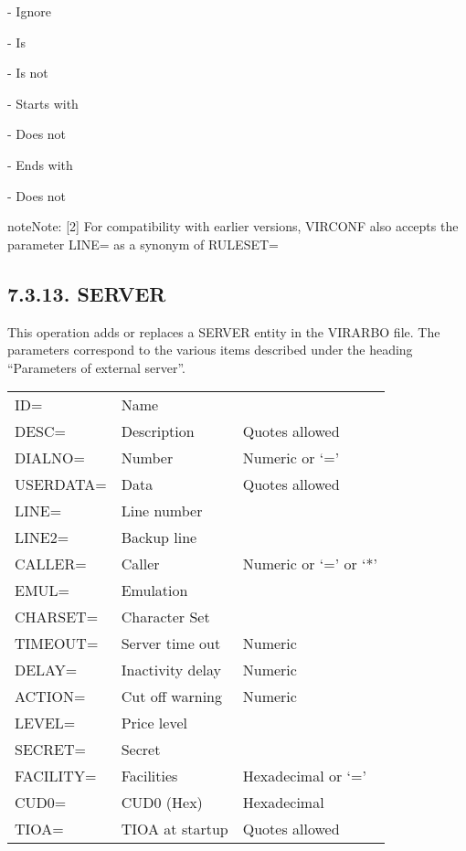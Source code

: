 \documentclass[letterpaper,10pt,english]{sphinxmanual}
\begin{document}
   - Ignore

    - Is

    - Is not

    - Starts with

 - Does not

      - Ends with

   - Does not

\begin{sphinxadmonition}{note}{Note:}
{[}2{]} For compatibility with earlier versions, VIRCONF also accepts the parameter LINE= as a synonym of RULESET=
\end{sphinxadmonition}


\subsection{7.3.13. SERVER}
\label{\detokenize{Installation_Guide:server}}
This operation adds or replaces a SERVER entity in the VIRARBO file. The parameters correspond to the various items described under the heading “Parameters of external server”.


\begin{savenotes}\sphinxattablestart
\centering
\begin{tabulary}{\linewidth}[t]{|T|T|T|}
\hline
{}\relax &\relax &\relax \\
\hline
ID=
&
Name
&\\
\hline
DESC=
&
Description
&
Quotes allowed
\\
\hline
DIALNO=
&
Number
&
Numeric or ‘=’
\\
\hline
USERDATA=
&
Data
&
Quotes allowed
\\
\hline
LINE=
&
Line number
&\\
\hline
LINE2=
&
Backup line
&\\
\hline
CALLER=
&
Caller
&
Numeric or ‘=’ or ‘*’
\\
\hline
EMUL=
&
Emulation
&\\
\hline
CHARSET=
&
Character Set
&\\
\hline
TIMEOUT=
&
Server time out
&
Numeric
\\
\hline
DELAY=
&
Inactivity delay
&
Numeric
\\
\hline
ACTION=
&
Cut off warning
&
Numeric
\\
\hline
LEVEL=
&
Price level
&\\
\hline
SECRET=
&
Secret
&\\
\hline
FACILITY=
&
Facilities
&
Hexadecimal or ‘=’
\\
\hline
CUD0=
&
CUD0 (Hex)
&
Hexadecimal
\\
\hline
TIOA=
&
TIOA at startup
&
Quotes allowed
\\
\hline
\end{tabulary}
\par
\sphinxattableend\end{savenotes}
\end{document}
